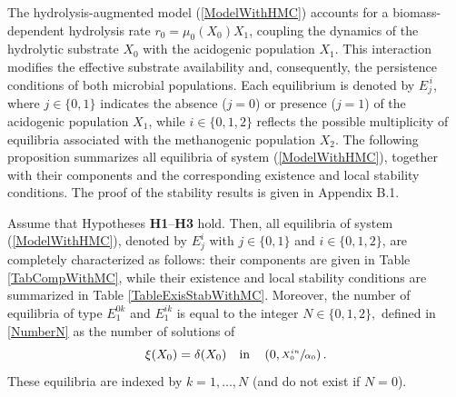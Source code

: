 \documentclass[runningheads]{llncs}
\begin{document}
The hydrolysis-augmented model (\ref{ModelWithHMC}) accounts for a biomass-dependent hydrolysis rate $r_0=\mu_0(X_0)X_1$, coupling the dynamics of the hydrolytic substrate $X_0$ with the acidogenic population $X_1$. This interaction modifies the effective substrate availability and, consequently, the persistence conditions of both microbial populations.
Each equilibrium is denoted by $E_j^{\,i}$, where $j\in\{0,1\}$ indicates the absence ($j=0$) or presence ($j=1$) of the acidogenic population $X_1$, while $i\in\{0,1,2\}$ reflects the possible multiplicity of equilibria associated with the methanogenic population $X_2$.
The following proposition summarizes all equilibria of system (\ref{ModelWithHMC}), together with their components and the corresponding existence and local stability conditions.
The proof of the stability results is given in Appendix B.1.
\begin{proposition}     \label{PropExiStabWMC}
Assume that Hypotheses \textbf{H1}--\textbf{H3} hold. 
Then, all equilibria of system (\ref{ModelWithHMC}), denoted by $E_j^i$ with $j\in\{0,1\}$ and $i\in\{0,1,2\}$, are completely characterized as follows: their components are given in Table \ref{TabCompWithMC}, while their existence and local stability conditions are summarized in Table \ref{TableExisStabWithMC}.
Moreover, the number of equilibria of type $E_1^{0k}$ and $E_1^{ik}$ is equal to the integer
$
N \in \{0,1,2\},
$
defined in \eqref{NumberN} as the number of solutions of
\[
\xi(X_0)=\delta(X_0)
\quad \text{in} \quad \left(0,\sfrac{X_0^{in}}{\alpha_0}\right).
\]
These equilibria are indexed by $k=1,\dots,N$ (and do not exist if $N=0$).
\end{proposition}
\end{document}
